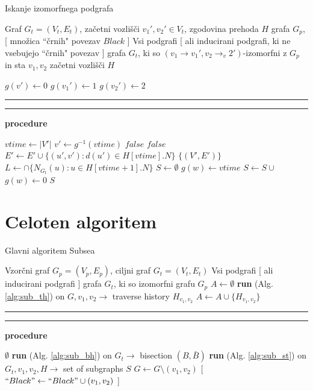 \documentclass[a4paper, 12pt, ]{book}
\newcommand\Subalg[1]{%
	\Statex%
	\vspace*{-.7\baselineskip}%
	\hspace*{\dimexpr-\algorithmicindent-4pt\relax}%
	\rule{\textwidth}{0.4pt}%
	\Statex%
	
	\vspace*{-.7\baselineskip}%
	\Statex\hspace*{\dimexpr-\algorithmicindent-2pt\relax}%
	\rule{\textwidth}{0.4pt}%
	
	\Statex\hspace*{-\algorithmicindent}\textbf{procedure} #1%
}
\newcommand{\refalg}[1]{(Alg. \ref{#1})}
\begin{document}
\begin{algorithm}
\caption{Iskanje izomorfnega podgrafa}
\label{alg:sub_st}
\begin{algorithmic}[1]
	\Require Graf $G_t = (V_t, E_t)$, začetni vozlišči $v_1', v_2' \in V_t$, zgodovina prehoda $H$ grafa $G_p$, [ množica ``črnih" povezav $Black$ ]
	\Ensure Vsi podgrafi [ ali inducirani podgrafi, ki ne vsebujejo ``črnih" povezav ] grafa $G_t$, ki so $(v_1 \to v_1', v_2 \to _v2')$-izomorfni z
	 $G_p$ in sta $v_1, v_2$ začetni vozlišči $H$
	 
	 	\State $g(v') \gets 0$
	\EndFor
	\State $g(v_1') \gets 1$
	\State $g(v_2') \gets 2$
	\State \Return {}

	
	\Subalg{}
	\State $vtime \gets |V'|$
	\State $v' \gets g^{-1}(vtime)$
		\State \Return $false$
	\EndIf
	\If {[ $H[vtime].N \not = \{ g(u') > 0: (v', u') \in E \}$ \textbf{or} $H[vtime].l \not = l(v')$ ]}
		\State \Return $false$
	\EndIf
	\State $E' \gets E' \cup \{ (u', v'): d(u') \in H[vtime].N \}$
		\Return $\{ (V', E') \}$
	\EndIf
	\State $L \gets \cap \{ N_{G_t}(u): u \in H[vtime + 1].N \}$
	\State $S \gets \emptyset$
			\State $g(w) \gets vtime$
			\State $S \gets S \cup$ 
			\State $g(w) \gets 0$
		\EndIf
	\EndFor
	\State \Return $S$
\end{algorithmic}
\end{algorithm}



	\section {Celoten algoritem}

\begin{algorithm}
\caption{Glavni algoritem Subsea}
\label{alg:sub_main}
\begin{algorithmic}[1]
	\Require Vzorčni graf $G_p = (V_p, E_p)$, ciljni graf $G_t = (V_t, E_t)$
	\Ensure Vsi podgrafi [ ali inducirani podgrafi ] grafa $G_t$, ki so izomorfni grafu $G_p$
	 \State $A \gets \emptyset$
	 	\State \textbf{run} \refalg{alg:sub_th} on $G, v_1, v_2 \to $ traverse history $H_{v_1, v_2}$
	 	\State $A \gets A \cup \{ H_{v_1, v_2} \}$
	 \EndFor
	 \State {}

	
	\Subalg{\Call{SubIso}{$A, G_t$}}
		\Return $\emptyset$
	\EndIf
	\State \textbf{run} \refalg{alg:sub_bh} on $G_t \to$ bisection $(B, \bar B)$
			\State \textbf{run} \refalg{alg:sub_st} on $G_t, v_1, v_2, H \to $ set of subgraphs $S$
			\State $G \gets G \setminus (v_1, v_2)$ [ $``Black" \gets ``Black" \cup (v_1, v_2)$ ]
		\EndFor
	\EndFor
	\State {}
			
\end{algorithmic}
\end{algorithm}
\end{document}
